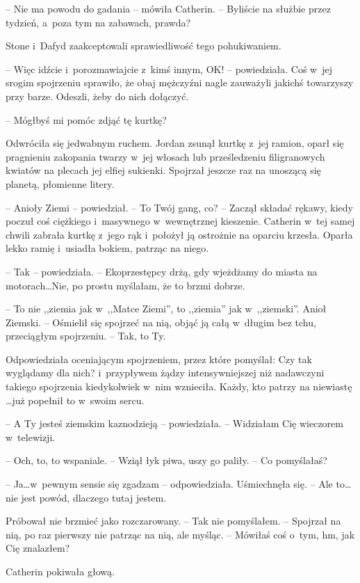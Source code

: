 \documentclass[oneside,polish,11pt,sfheadings]{mwbk}
\begin{document}
-- Nie ma powodu do gadania -- mówiła Catherin. -- Byliście na służbie
przez tydzień, a~poza tym na zabawach, prawda?

Stone i~Dafyd zaakceptowali sprawiedliwość tego pohukiwaniem.

-- Więc idźcie i~porozmawiajcie z~kimś innym, OK! -- powiedziała. Coś w~jej srogim spojrzeniu sprawiło, że obaj mężczyźni nagle zauważyli
jakichś towarzyszy przy barze. Odeszli, żeby do nich dołączyć.

-- Mógłbyś mi pomóc zdjąć tę kurtkę?

Odwróciła się jedwabnym ruchem. Jordan zsunął kurtkę z~jej ramion, oparł
się pragnieniu zakopania twarzy w~jej włosach lub prześledzeniu
filigranowych kwiatów na plecach jej elfiej sukienki. Spojrzał jeszcze
raz na unoszącą się planetą, płomienne litery.

-- Anioły Ziemi -- powiedział. -- To Twój gang, co? -- Zaczął składać
rękawy, kiedy poczuł coś ciężkiego i~masywnego w~wewnętrznej kieszenie.
Catherin w~tej samej chwili zabrała kurtkę z~jego rąk i~położył ją
ostrożnie na oparciu krzesła. Oparła lekko ramię i~usiadła bokiem,
patrząc na niego.

-- Tak -- powiedziała. -- Ekoprzestępcy drżą, gdy wjeżdżamy do miasta na
motorach\ldots Nie, po prostu myślałam, że to brzmi dobrze.

-- To nie ,,ziemia jak w~,,Matce Ziemi'', to ,,ziemia'' jak w~,,ziemski''. Anioł
Ziemski. -- Ośmielił się spojrzeć na nią, objąć ją całą w~długim bez
tchu, przeciągłym spojrzeniu. -- Tak, to Ty.

Odpowiedziała oceniającym spojrzeniem, przez które pomyślał: Czy tak
wyglądamy dla nich? i~przypływem żądzy intensywniejszej niż nadawczyni
takiego spojrzenia kiedykolwiek w~nim wznieciła. Każdy, kto patrzy na
niewiastę \ldots już popełnił to w~swoim sercu.

-- A Ty jesteś ziemskim kaznodzieją -- powiedziała. -- Widziałam Cię
wieczorem w~telewizji.

-- Och, to, to wspaniale. -- Wziął łyk piwa, uszy go paliły. -- Co
pomyślałaś?

-- Ja\ldots w~pewnym sensie się zgadzam -- odpowiedziała. Uśmiechnęła się. -- Ale to\ldots nie jest powód, dlaczego tutaj jestem.

Próbował nie brzmieć jako rozczarowany. -- Tak nie pomyślałem. -- Spojrzał
na nią, po raz pierwszy nie patrząc na nią, ale myśląc. -- Mówiłaś coś o~tym, hm, jak Cię znalazłem?

Catherin pokiwała głową.
\end{document}
